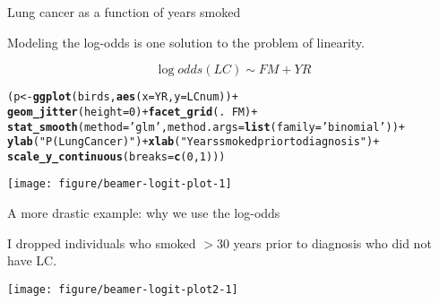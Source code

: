 \documentclass[table]{beamer}\usepackage[]{graphicx}\usepackage[]{color}
\makeatletter
\def\maxwidth{ %
  \ifdim\Gin@nat@width>\linewidth
    \linewidth
  \else
    \Gin@nat@width
  \fi
}
\newcommand{\hlnum}[1]{\textcolor[rgb]{0.686,0.059,0.569}{#1}}%
\newcommand{\hlstr}[1]{\textcolor[rgb]{0.192,0.494,0.8}{#1}}%
\newcommand{\hlopt}[1]{\textcolor[rgb]{0,0,0}{#1}}%
\newcommand{\hlstd}[1]{\textcolor[rgb]{0.345,0.345,0.345}{#1}}%
\newcommand{\hlkwb}[1]{\textcolor[rgb]{0.69,0.353,0.396}{#1}}%
\newcommand{\hlkwc}[1]{\textcolor[rgb]{0.333,0.667,0.333}{#1}}%
\newcommand{\hlkwd}[1]{\textcolor[rgb]{0.737,0.353,0.396}{\textbf{#1}}}%
\newenvironment{kframe}{%
 \def\at@end@of@kframe{}%
 \ifinner\ifhmode%
  \def\at@end@of@kframe{\end{minipage}}%
  \begin{minipage}{\columnwidth}%
 \fi\fi%
 \def\FrameCommand##1{\hskip\@totalleftmargin \hskip-\fboxsep
 \colorbox{shadecolor}{##1}\hskip-\fboxsep
     \hskip-\linewidth \hskip-\@totalleftmargin \hskip\columnwidth}%
 \MakeFramed {\advance\hsize-\width
   \@totalleftmargin\z@ \linewidth\hsize
   \@setminipage}}%
 {\par\unskip\endMakeFramed%
 \at@end@of@kframe}
\newenvironment{knitrout}{}{} %
\makeatother
\begin{document}
\begin{frame}[fragile]{Lung cancer as a function of years smoked}

Modeling the log-odds is one solution to the problem of linearity.

$$ \log odds(LC) \sim FM + YR $$


\begin{knitrout}\scriptsize
{}\color{fgcolor}\begin{kframe}
\begin{alltt}
\hlstd{(p} \hlkwb{<-} \hlkwd{ggplot}\hlstd{(birds,} \hlkwd{aes}\hlstd{(}\hlkwc{x}\hlstd{=YR,} \hlkwc{y}\hlstd{=LCnum))} \hlopt{+}
   \hlkwd{geom_jitter}\hlstd{(}\hlkwc{height}\hlstd{=}\hlnum{0}\hlstd{)} \hlopt{+} \hlkwd{facet_grid}\hlstd{(.}\hlopt{~}\hlstd{FM)} \hlopt{+}
   \hlkwd{stat_smooth}\hlstd{(}\hlkwc{method}\hlstd{=}\hlstr{'glm'}\hlstd{,} \hlkwc{method.args}\hlstd{=}\hlkwd{list}\hlstd{(}\hlkwc{family}\hlstd{=}\hlstr{'binomial'}\hlstd{))} \hlopt{+}
   \hlkwd{ylab}\hlstd{(}\hlstr{"P(Lung Cancer)"}\hlstd{)} \hlopt{+} \hlkwd{xlab}\hlstd{(}\hlstr{"Years smoked prior to diagnosis"}\hlstd{)} \hlopt{+}
   \hlkwd{scale_y_continuous}\hlstd{(}\hlkwc{breaks}\hlstd{=}\hlkwd{c}\hlstd{(}\hlnum{0}\hlstd{,}\hlnum{1}\hlstd{)))}
\end{alltt}
\end{kframe}

{\centering \texttt{[image: figure/beamer-logit-plot-1]} 

}



\end{knitrout}


\end{frame}



\begin{frame}[fragile]{A more drastic example: why we use the log-odds}

I dropped individuals who smoked $>$30 years prior to diagnosis who did not have LC.

\begin{knitrout}\scriptsize
{}\color{fgcolor}

{\centering \texttt{[image: figure/beamer-logit-plot2-1]} 

}



\end{knitrout}


\end{frame}
\end{document}
